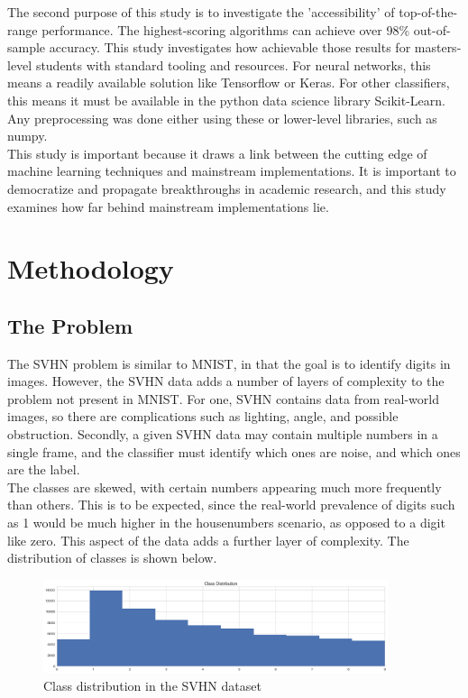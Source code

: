 \documentclass[11pt]{article}
\begin{document}
The second purpose of this study is to investigate the 'accessibility' of top-of-the-range performance. The highest-scoring algorithms can achieve over 98\% out-of-sample accuracy. This study investigates how achievable those results for masters-level students with standard tooling and resources. For neural networks, this means a readily available solution like Tensorflow or Keras. For other classifiers, this means it must be available in the python data science library Scikit-Learn. Any preprocessing was done either using these or lower-level libraries, such as numpy.\\

This study is important because it draws a link between the cutting edge of machine learning techniques and mainstream implementations. It is important to democratize and propagate breakthroughs in academic research, and this study examines how far behind mainstream implementations lie.

\section{Methodology}

\subsection{The Problem}
The SVHN problem is similar to MNIST, in that the goal is to identify digits in images. However, the SVHN data adds a number of layers of complexity to the problem not present in MNIST. For one, SVHN contains data from real-world images, so there are complications such as lighting, angle, and possible obstruction. Secondly, a given SVHN data may contain multiple numbers in a single frame, and the classifier must identify which ones are noise, and which ones are the label.\\

The classes are skewed, with certain numbers appearing much more frequently than others. This is to be expected, since the real-world prevalence of digits such as 1 would be much higher in the housenumbers scenario, as opposed to a digit like zero. This aspect of the data adds a further layer of complexity. The distribution of classes is shown below.
\begin{figure}[h]
\caption{Class distribution in the SVHN dataset}
\centering
\includegraphics[width=0.9\textwidth]{images/svhn_classes.png}
\end{figure}
\end{document}
